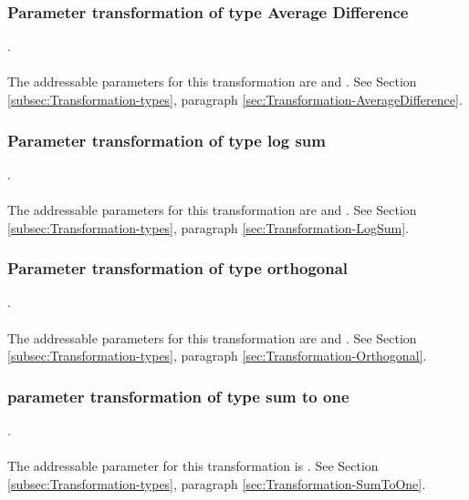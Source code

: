 \subsubsection{Parameter transformation of type Average Difference}
.
\label{syntax:Transformation-AverageDifference} \\ \\
The addressable parameters for this transformation are  and . See Section \ref{subsec:Transformation-types}, paragraph \ref{sec:Transformation-AverageDifference}.

\subsubsection{Parameter transformation of type log sum}
.
\label{syntax:Transformation-LogSum} \\ \\
The addressable parameters for this transformation are  and . See Section \ref{subsec:Transformation-types}, paragraph \ref{sec:Transformation-LogSum}.

\subsubsection{Parameter transformation of type orthogonal}
.
\label{syntax:Transformation-Orthogonal} \\ \\
The addressable parameters for this transformation are  and . See Section \ref{subsec:Transformation-types}, paragraph \ref{sec:Transformation-Orthogonal}.

\subsubsection{parameter transformation of type sum to one}
.
\label{syntax:Transformation-SumToOne} \\ \\
The addressable parameter for this transformation is . See Section \ref{subsec:Transformation-types}, paragraph \ref{sec:Transformation-SumToOne}.

